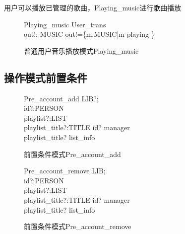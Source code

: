 \documentclass[14pt]{article}
\numberwithin{figure}{subsection}
\begin{document}
用户可以播放已管理的歌曲，Playing\_music进行歌曲播放
\vspace{-0.5cm}
\begin{figure}[H]
    \setlength{\abovecaptionskip}{0.cm}
    \setlength{\belowcaptionskip}{0.cm}
    \begin{schema}{Playing\_music}
        User\_trans\\
        out!: \power MUSIC
        \where
        out!=\{m:MUSIC|m \in \dom playing \}
    \end{schema}
    \caption{普通用户音乐播放模式Playing\_music}
\end{figure}

\subsection{操作模式前置条件}
\vspace{-0.5cm}
\begin{figure}[H]
    \setlength{\abovecaptionskip}{0.cm}
    \setlength{\belowcaptionskip}{0.cm}
    \begin{schema}{Pre\_account\_add}
        LIB?;\\
        id?:PERSON\\
        playlist?:LIST\\
        playlist\_title?:TITLE
        \where
        id? \in manager\\
        playlist\_title? \not \in \ran list_info
    \end{schema}
    \caption{前置条件模式Pre\_account\_add}
\end{figure}
\vspace{-0.5cm}
\begin{figure}[H]
    \setlength{\abovecaptionskip}{0.cm}
    \setlength{\belowcaptionskip}{0.cm}
    \begin{schema}{Pre\_account\_remove}
        LIB;\\
        id?:PERSON\\
        playlist?:LIST\\
        playlist\_title?:TITLE
        \where
        id? \in manager\\
        playlist\_title? \in \ran list_info
    \end{schema}
    \caption{前置条件模式Pre\_account\_remove}
\end{figure}
\vspace{-0.5cm}
\end{document}
